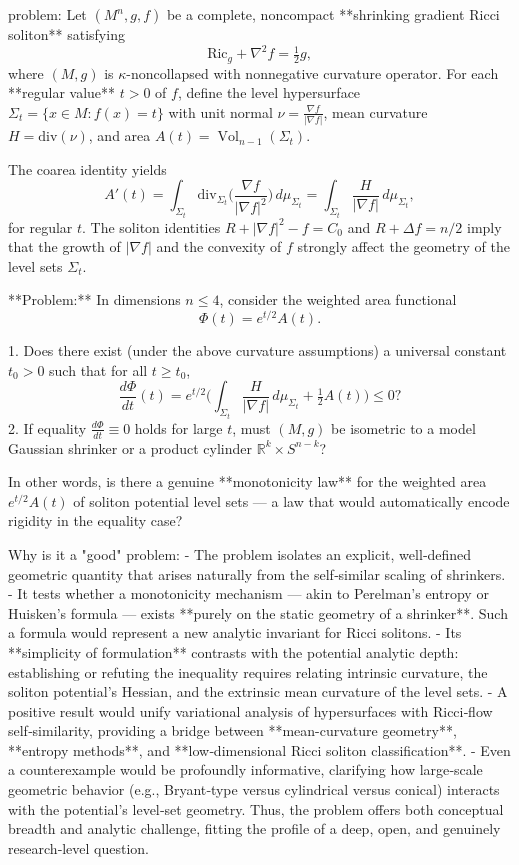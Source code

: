 problem:  
Let \((M^n,g,f)\) be a complete, noncompact **shrinking gradient Ricci soliton** satisfying  
\[
\mathrm{Ric}_g+\nabla^2 f=\tfrac12 g,
\]
where \((M,g)\) is \(\kappa\)-noncollapsed with nonnegative curvature operator.  
For each **regular value** \(t>0\) of \(f\), define the level hypersurface  
\(\Sigma_t=\{x\in M: f(x)=t\}\)  
with unit normal \(\nu=\frac{\nabla f}{|\nabla f|}\), mean curvature \(H=\mathrm{div}(\nu)\), and area \(A(t)=\operatorname{Vol}_{n-1}(\Sigma_t)\).

The coarea identity yields
\[
A'(t)=\int_{\Sigma_t}\mathrm{div}_{\Sigma_t}
\Big(\frac{\nabla f}{|\nabla f|^2}\Big)\,d\mu_{\Sigma_t}
=\int_{\Sigma_t}\frac{H}{|\nabla f|}\,d\mu_{\Sigma_t},
\]
for regular \(t\).  
The soliton identities \(R+|\nabla f|^2-f=C_0\) and \(R+\Delta f=n/2\) imply that the growth of \(|\nabla f|\) and the convexity of \(f\) strongly affect the geometry of the level sets \(\Sigma_t\).

**Problem:**  
In dimensions \(n\le4\), consider the weighted area functional
\[
\Phi(t)=e^{t/2} A(t).
\]

1. Does there exist (under the above curvature assumptions) a universal constant \(t_0>0\) such that for all \(t\ge t_0\),
\[
\frac{d\Phi}{dt}(t)
= e^{t/2}\Big(\int_{\Sigma_t}\frac{H}{|\nabla f|}\,d\mu_{\Sigma_t}+\tfrac12 A(t)\Big)
\le 0 ?
\]
2. If equality \(\frac{d\Phi}{dt}\equiv 0\) holds for large \(t\), must \((M,g)\) be isometric to a model Gaussian shrinker or a product cylinder \(\mathbb{R}^k\times S^{n-k}\)?

In other words, is there a genuine **monotonicity law** for the weighted area \(e^{t/2}A(t)\) of soliton potential level sets — a law that would automatically encode rigidity in the equality case?

Why is it a "good" problem:  
- The problem isolates an explicit, well‑defined geometric quantity that arises naturally from the self‑similar scaling of shrinkers.  
- It tests whether a monotonicity mechanism — akin to Perelman’s entropy or Huisken’s formula — exists **purely on the static geometry of a shrinker**. Such a formula would represent a new analytic invariant for Ricci solitons.  
- Its **simplicity of formulation** contrasts with the potential analytic depth: establishing or refuting the inequality requires relating intrinsic curvature, the soliton potential’s Hessian, and the extrinsic mean curvature of the level sets.  
- A positive result would unify variational analysis of hypersurfaces with Ricci‑flow self‑similarity, providing a bridge between **mean-curvature geometry**, **entropy methods**, and **low‑dimensional Ricci soliton classification**.  
- Even a counterexample would be profoundly informative, clarifying how large‑scale geometric behavior (e.g., Bryant‑type versus cylindrical versus conical) interacts with the potential's level‑set geometry.  
Thus, the problem offers both conceptual breadth and analytic challenge, fitting the profile of a deep, open, and genuinely research‑level question.